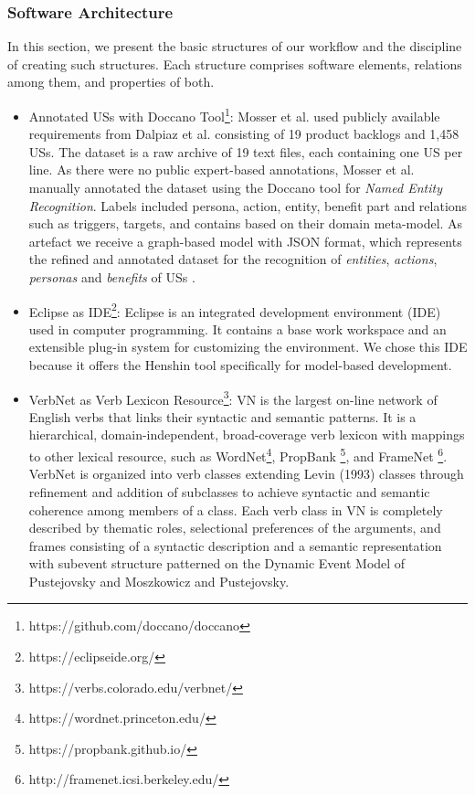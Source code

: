 \subsubsection*{Software Architecture}\label{conflict_architectur}
In this section, we present the basic structures of our workflow and the discipline of creating such structures. Each structure comprises software elements, relations among them, and properties of both.
\begin{itemize}
	\item Annotated USs with Doccano Tool\footnote{https://github.com/doccano/doccano}: Mosser et al. used publicly available requirements from Dalpiaz et al.\cite{Dalpiaz2018} consisting of 19 product backlogs and 1,458 USs. The dataset is a raw archive of 19 text files, each containing one US per line. As there were no public expert-based annotations, Mosser et al. manually annotated the dataset using the Doccano tool for \textit{Named Entity Recognition}. Labels included persona, action, entity, benefit part and relations such as triggers, targets, and contains based on their domain meta-model.
	As artefact we receive a graph-based model with JSON format, which represents the refined and annotated dataset for the recognition of \emph{entities}, \emph{actions}, \emph{personas} and \emph{benefits} of USs \cite{mosser2022modelling}.
	
	\item Eclipse as IDE\footnote{https://eclipseide.org/}: Eclipse is an integrated development environment (IDE) used in computer programming. It contains a base work workspace and an extensible plug-in system for customizing the environment.
	We chose this IDE because it offers the Henshin tool specifically for model-based development.
	
	\item VerbNet as Verb Lexicon Resource\footnote{https://verbs.colorado.edu/verbnet/}: VN is the largest on-line network of English verbs that links their syntactic and semantic patterns. It is a hierarchical, domain-independent, broad-coverage verb lexicon with mappings to other lexical resource, such as WordNet\footnote{https://wordnet.princeton.edu/}, PropBank \footnote{https://propbank.github.io/}, and FrameNet \footnote{http://framenet.icsi.berkeley.edu/}. VerbNet is organized into verb classes extending Levin (1993) classes through refinement and addition of subclasses to achieve syntactic and semantic coherence among members of a class. Each verb class in VN is completely described by thematic roles, selectional preferences of the arguments, and frames consisting of a syntactic description and a semantic representation with subevent structure patterned on the Dynamic Event Model of Pustejovsky and Moszkowicz and Pustejovsky\cite{kipper2006extending}.
	

\end{itemize}
